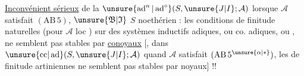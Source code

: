 \uline{Inconvénient sérieux} de la 
$\unsure{\operatorname{ad}^{n}|\operatorname{ad}^{\circ}}(S,\unsure{J|I};\mathcal A)$ lorsque $\mathcal A$ satisfait $(\mathrm{AB}\,5)$, $\unsure{\mathfrak B|\mathfrak I}$ $S$ noethérien : les conditions de finitude naturelles (pour $\mathcal A$ loc ) sur des systèmes inductifs adiques, ou co. adiques, ou , ne semblent pas stables par \uline{conoyaux} [, dans $\unsure{\mathrm{cc}|\operatorname{ad}}(S,\unsure{J|I};\mathcal A)$ quand $\mathcal A$ satisfait $(\mathrm{AB}\,5^{\unsure{\alpha|*}})$, les  de finitude artiniennes ne semblent pas stables par noyaux] !!

